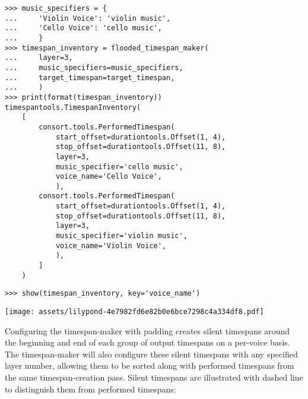 \begin{abjadbookoutput}
\begin{singlespacing}
\vspace{-0.5\baselineskip}
\begin{verbatim}
>>> music_specifiers = {
...     'Violin Voice': 'violin music',
...     'Cello Voice': 'cello music',
...     }
>>> timespan_inventory = flooded_timespan_maker(
...     layer=3,
...     music_specifiers=music_specifiers,
...     target_timespan=target_timespan,
...     )
>>> print(format(timespan_inventory))
timespantools.TimespanInventory(
    [
        consort.tools.PerformedTimespan(
            start_offset=durationtools.Offset(1, 4),
            stop_offset=durationtools.Offset(11, 8),
            layer=3,
            music_specifier='cello music',
            voice_name='Cello Voice',
            ),
        consort.tools.PerformedTimespan(
            start_offset=durationtools.Offset(1, 4),
            stop_offset=durationtools.Offset(11, 8),
            layer=3,
            music_specifier='violin music',
            voice_name='Violin Voice',
            ),
        ]
    )
\end{verbatim}
\begin{verbatim}
>>> show(timespan_inventory, key='voice_name')
\end{verbatim}
\noindent\texttt{[image: assets/lilypond-4e7982fd6e82b0e6bce7298c4a334df8.pdf]}
\end{singlespacing}
\end{abjadbookoutput}

\noindent Configuring the timespan-maker with padding creates silent timespans
around the beginning and end of each group of output timespans on a per-voice
basis. The timespan-maker will also configure these silent timespans with any
specified layer number, allowing them to be sorted along with performed
timespans from the same timespan-creation pass. Silent timespans are
illustrated with dashed line to distinguish them from performed timespans:

\begin{comment}
<abjad>
flooded_timespan_maker = consort.FloodedTimespanMaker(
    padding=Duration(1, 4),
    timespan_specifier=consort.TimespanSpecifier(
        minimum_duration=Duration(1, 8),
        ),
    )
timespan_inventory = flooded_timespan_maker(
    layer=5,
    music_specifiers=music_specifiers,
    target_timespan=target_timespan,
    )
print(format(timespan_inventory))
show(timespan_inventory, key='voice_name')
</abjad>
\end{comment}

